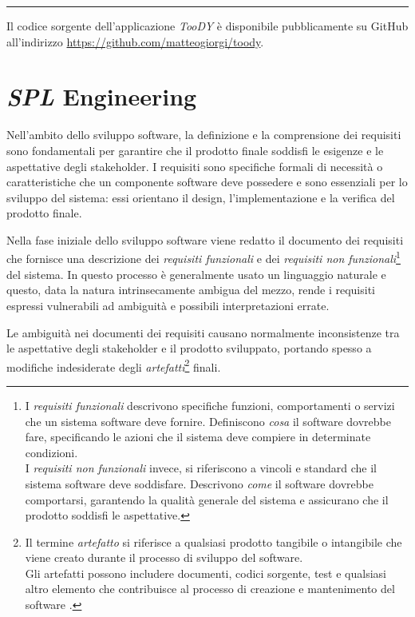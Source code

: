 \documentclass[12pt]{report}
\newcommand{\toody}{\textsl{TooDY}\xspace}
\newcommand{\spl}{\textsl{SPL}\xspace}
\begin{document}
{\centering \rule{0.5\linewidth}{0.1pt} \par\vspace{0.25cm}}

\noindent Il codice sorgente dell'applicazione \toody è disponibile pubblicamente su GitHub all'indirizzo \url{https://github.com/matteogiorgi/toody}.


\clearpage\thispagestyle{empty}
\null\newpage




\chapter{\spl Engineering}
\label{ch:sple}
Nell'ambito dello sviluppo software, la definizione e la comprensione dei requisiti sono fondamentali per garantire che il prodotto finale soddisfi le esigenze e le aspettative degli stakeholder. I requisiti sono specifiche formali di necessità o caratteristiche che un componente software deve possedere e sono essenziali per lo sviluppo del sistema: essi orientano il design, l'implementazione e la verifica del prodotto finale.

Nella fase iniziale dello sviluppo software viene redatto il documento dei requisiti che fornisce una descrizione dei \textit{requisiti funzionali} e dei \textit{requisiti non funzionali}\footnote{I \textit{requisiti funzionali} descrivono specifiche funzioni, comportamenti o servizi che un sistema software deve fornire. Definiscono \textit{cosa} il software dovrebbe fare, specificando le azioni che il sistema deve compiere in determinate condizioni.\\
I \textit{requisiti non funzionali} invece, si riferiscono a vincoli e standard che il sistema software deve soddisfare. Descrivono \textit{come} il software dovrebbe comportarsi, garantendo la qualità generale del sistema e assicurano che il prodotto soddisfi le aspettative.} del sistema. In questo processo è generalmente usato un linguaggio naturale e questo, data la natura intrinsecamente ambigua del mezzo, rende i requisiti espressi vulnerabili ad ambiguità e possibili interpretazioni errate.

Le ambiguità nei documenti dei requisiti causano normalmente inconsistenze tra le aspettative degli stakeholder e il prodotto sviluppato, portando spesso a modifiche indesiderate degli \textit{artefatti}\footnote{Il termine \textit{artefatto} si riferisce a qualsiasi prodotto tangibile o intangibile che viene creato durante il processo di sviluppo del software.\\
Gli artefatti possono includere documenti, codici sorgente, test e qualsiasi altro elemento che contribuisce al processo di creazione e mantenimento del software \cite{pohl:bockle:linden}.} finali.
\end{document}
